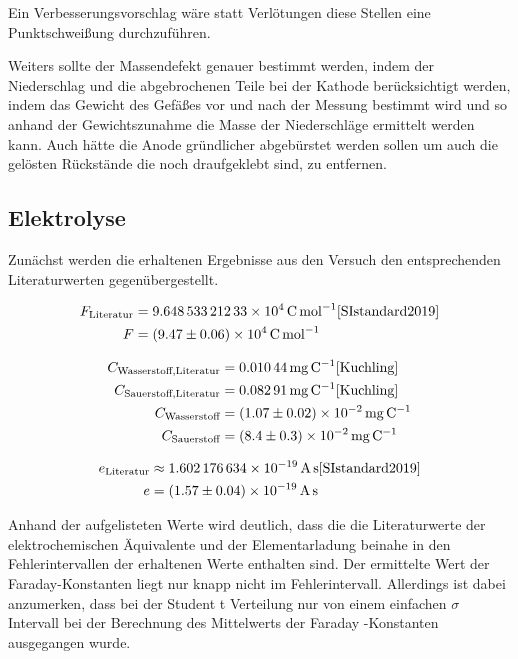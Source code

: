 \documentclass[11pt,ngerman]{scrartcl}
\begin{document}
\vspace{2mm}

Ein Verbesserungsvorschlag wäre statt Verlötungen diese Stellen eine Punktschweißung durchzuführen.

\vspace{2mm}

Weiters sollte der Massendefekt genauer bestimmt werden, indem der Niederschlag und die abgebrochenen Teile bei der Kathode berücksichtigt werden, indem das Gewicht des Gefäßes vor und nach der Messung bestimmt wird und so anhand der Gewichtszunahme die Masse der Niederschläge ermittelt werden kann. Auch hätte die Anode gründlicher abgebürstet werden sollen um auch die gelösten Rückstände die noch draufgeklebt sind, zu entfernen.

\newpage

\subsection{Elektrolyse}

Zunächst werden die erhaltenen Ergebnisse aus den Versuch den entsprechenden Literaturwerten gegenübergestellt.

\begin{align*}
	F_{\text{Literatur}} & = \SI{9.64853321233e4}{\coulomb\per\mol} \cite{SIstandard2019} \\
	F                    & = \SI{9.47(6)e4}{\coulomb\per\mol}
\end{align*}

\begin{align*}
	C_{\text{Wasserstoff,Literatur}} & = \SI{0,01044}{\mg\per\coulomb}\cite{Kuchling} \\
	C_{\text{Sauerstoff,Literatur}}  & = \SI{0,08291}{\mg\per\coulomb}\cite{Kuchling} \\
	C_{\text{Wasserstoff}}           & = \SI{1.07(2)e-02}{\mg\per\coulomb}            \\
	C_{\text{Sauerstoff}}            & = \SI{8.4(3)e-02}{\mg\per\coulomb}
\end{align*}

\begin{align*}
	e_{\text{Literatur}} & \approx \SI{1.602176634e-19}{\ampere\second}\cite{SIstandard2019} \\
	e                    & = \SI{1.57(4)e-19}{\ampere\second}
\end{align*}

Anhand der aufgelisteten Werte wird deutlich, dass die die Literaturwerte der elektrochemischen Äquivalente und der Elementarladung beinahe in den Fehlerintervallen der erhaltenen Werte enthalten sind. Der ermittelte Wert der Faraday-Konstanten liegt nur knapp nicht im Fehlerintervall. Allerdings ist dabei anzumerken, dass bei der Student t Verteilung nur von einem einfachen $\sigma$ Intervall bei der Berechnung des Mittelwerts der Faraday -Konstanten ausgegangen wurde.
\end{document}
